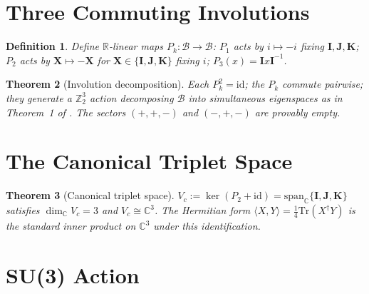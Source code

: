 \documentclass[12pt,a4paper]{article}
\newtheorem{theorem}{Theorem}[section]
\newtheorem{definition}[theorem]{Definition}
\theoremstyle{remark}
\begin{document}
\section{Three Commuting Involutions}
\label{sec:involutions}

\begin{definition}
  \label{def:involutions}
  Define $\mathbb{R}$-linear maps $P_k:\mathcal{B}\to\mathcal{B}$:
  $P_1$ acts by $i\mapsto -i$ fixing $\mathbf{I},\mathbf{J},\mathbf{K}$;
  $P_2$ acts by $\mathbf{X}\mapsto -\mathbf{X}$ for $\mathbf{X}\in\{
  \mathbf{I},\mathbf{J},\mathbf{K}\}$ fixing $i$;
  $P_3(x)=\mathbf{I}x\mathbf{I}^{-1}$.
\end{definition}

\begin{theorem}[Involution decomposition]
  \label{thm:involution_decomp}
  Each $P_k^2=\mathrm{id}$; the $P_k$ commute pairwise; they generate a
  $\mathbb{Z}_2^3$ action decomposing $\mathcal{B}$ into simultaneous
  eigenspaces as in Theorem~1 of \cite{mainpaper}.
  The sectors $(+,+,-)$ and $(-,+,-)$ are provably empty.
\end{theorem}

\section{The Canonical Triplet Space}
\label{sec:triplet}

\begin{theorem}[Canonical triplet space]
  \label{thm:triplet_space}
  $V_c := \ker(P_2+\mathrm{id})
  = \mathrm{span}_\mathbb{C}\{\mathbf{I},\mathbf{J},\mathbf{K}\}$
  satisfies $\dim_\mathbb{C}V_c=3$ and $V_c\cong\mathbb{C}^3$.
  The Hermitian form $\langle X,Y\rangle = \frac{1}{4}\mathrm{Tr}(X^\dagger Y)$
  is the standard inner product on $\mathbb{C}^3$ under this identification.
\end{theorem}

\section{SU(3) Action}
\label{sec:su3}
\end{document}
